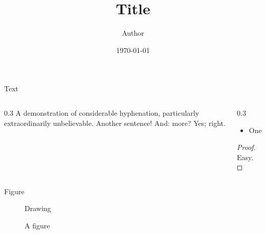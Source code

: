 \documentclass{beamer}
\title{Title}
\author{Author}
\date{\today}
\begin{document}
\begin{frame}
\titlepage
\end{frame}
\begin{frame}{Text}
\begin{columns}
\begin{column}{0.3\textwidth}
A demonstration of considerable hyphenation, particularly extraordinarily unbelievable. Another sentence! And: more? Yes; right.
\end{column}
\begin{column}{0.3\textwidth}
\begin{itemize}
\item One
\end{itemize}
\begin{proof}Easy.\end{proof}
\end{column}
\end{columns}
\end{frame}
\begin{frame}{Figure}
\begin{figure}
Drawing
\caption{A figure}
\end{figure}
\end{frame}
\end{document}
